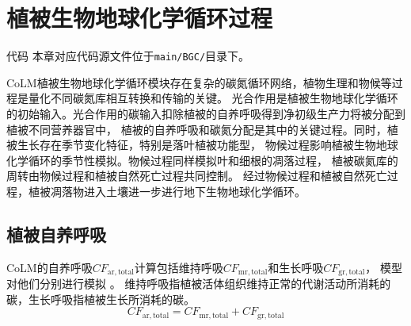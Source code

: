 \chapter{植被生物地球化学循环过程}\label{植被生物地球化学循环过程}
\begin{mymdframed}{代码}
  本章对应代码源文件位于\texttt{main/BGC/}目录下。
\end{mymdframed}

CoLM植被生物地球化学循环模块存在复杂的碳氮循环网络，植物生理和物候等过程是量化不同碳氮库相互转换和传输的关键。
光合作用是植被生物地球化学循环的初始输入。光合作用的碳输入扣除植被的自养呼吸得到净初级生产力将被分配到植被不同营养器官中，
植被的自养呼吸和碳氮分配是其中的关键过程。同时，植被生长存在季节变化特征，特别是落叶植被功能型，
物候过程影响植被生物地球化学循环的季节性模拟。物候过程同样模拟叶和细根的凋落过程，
植被碳氮库的周转由物候过程和植被自然死亡过程共同控制。
经过物候过程和植被自然死亡过程，植被凋落物进入土壤进一步进行地下生物地球化学循环。
\section{植被自养呼吸}\label{植被自养呼吸}

CoLM的自养呼吸$CF_{\mathrm{ar,total}}$计算包括维持呼吸$CF_{\mathrm{mr,total}}$和生长呼吸$CF_{\mathrm{gr,total}}$，
模型对他们分别进行模拟 \citep{lavigne1997growth,sprugel1995respiration}。
维持呼吸指植被活体组织维持正常的代谢活动所消耗的碳，生长呼吸指植被生长所消耗的碳。
\begin{equation}
  CF_{\mathrm{ar,total}}=CF_{\mathrm{mr, total}}+CF_{\mathrm{gr,total}}
\end{equation}
